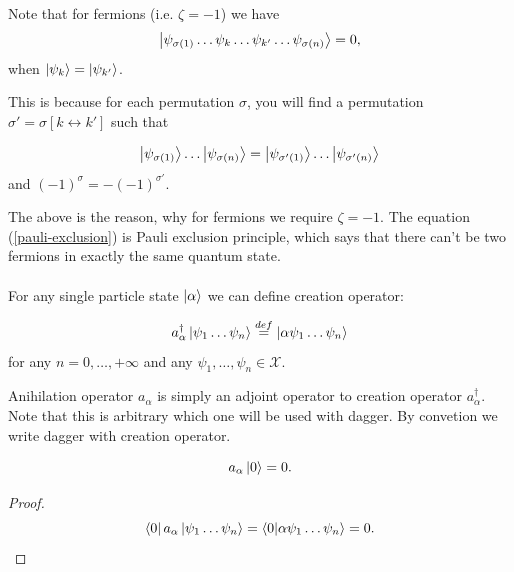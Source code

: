\documentclass[main.tex]{subfiles}
\begin{document}
\paragraph{}
Note that for fermions (i.e. $\zeta = -1$) we have
\begin{equation}
\label{pauli-exclusion}
\ket{\psi_{\sigma(1)} \dots \psi_k \dots \psi_{k'} \dots \psi_{\sigma(n)}} = 0,
\end{equation}
when $\ket{\psi_k} = \ket{\psi_{k'}}$.

This is because for each permutation $\sigma$, you will find a permutation 
$\sigma' = \sigma [k\leftrightarrow k']$ such that

\begin{equation}
\ket{\psi_{\sigma(1)}} \dots \ket{\psi_{\sigma(n)}} = \ket{\psi_{\sigma'(1)}} \dots  \ket{\psi_{\sigma'(n)}}
\end{equation}
and $(-1)^\sigma = -(-1)^{\sigma'}$.

The above is the reason, why for fermions we require $\zeta = -1$. The equation (\ref{pauli-exclusion}) is Pauli exclusion principle, which says that there can't be two fermions in exactly the same quantum state.

\paragraph{}
For any single particle state $\ket{\alpha}$ we can define creation operator:
\begin{definition}
\begin{equation}
a^\dagger_\alpha \ket{\psi_1\dots\psi_n} \stackrel{def}{=} \ket{\alpha \psi_1\dots\psi_n}
\end{equation}
for any $n=0, \dots, +\infty$ and any $\psi_1, \dots, \psi_n\in \mathcal{X}$.
\end{definition}

Anihilation operator $a_\alpha$ is simply an adjoint operator to creation operator $a^\dagger_\alpha$. Note that this is arbitrary which one will be used with dagger. By convetion we write dagger with creation operator.

\begin{proposition}
\begin{equation}
a_\alpha \ket{0} = 0.
\end{equation}

\begin{proof}
\begin{equation}
\bra{0} a_\alpha \ket{\psi_1\dots\psi_n} = \bra{0} \ket{\alpha \psi_1\dots\psi_n} = 0.
\end{equation}
\end{proof}
\end{proposition}  
\end{document}
